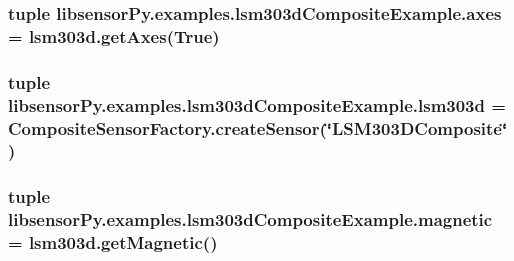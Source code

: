 \subsubsection[{axes}]{\setlength{\rightskip}{0pt plus 5cm}tuple libsensor\+Py.\+examples.\+lsm303d\+Composite\+Example.\+axes = lsm303d.\+get\+Axes(True)}\label{namespacelibsensorPy_1_1examples_1_1lsm303dCompositeExample_a887c2a6fed9f7e9ca41112dc9a2fef27}
\hypertarget{namespacelibsensorPy_1_1examples_1_1lsm303dCompositeExample_a1bb1ae50f2def88d8dd32ee9a396ee93}{}
\subsubsection[{lsm303d}]{\setlength{\rightskip}{0pt plus 5cm}tuple libsensor\+Py.\+examples.\+lsm303d\+Composite\+Example.\+lsm303d = {\bf Composite\+Sensor\+Factory.\+create\+Sensor}(\char`\"{}L\+S\+M303\+D\+Composite\char`\"{})}\label{namespacelibsensorPy_1_1examples_1_1lsm303dCompositeExample_a1bb1ae50f2def88d8dd32ee9a396ee93}
\hypertarget{namespacelibsensorPy_1_1examples_1_1lsm303dCompositeExample_ab929728d12d6267ec719a914d63ecef3}{}
\subsubsection[{magnetic}]{\setlength{\rightskip}{0pt plus 5cm}tuple libsensor\+Py.\+examples.\+lsm303d\+Composite\+Example.\+magnetic = lsm303d.\+get\+Magnetic()}\label{namespacelibsensorPy_1_1examples_1_1lsm303dCompositeExample_ab929728d12d6267ec719a914d63ecef3}
